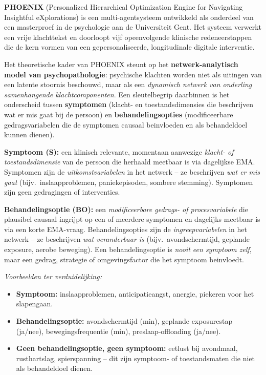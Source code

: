 \documentclass[11pt,a4paper]{article}
\begin{document}
\textbf{PHOENIX} (Personalized Hierarchical Optimization Engine for Navigating
Insightful eXplorations) is een multi-agentsysteem ontwikkeld als onderdeel van
een masterproef in de psychologie aan de Universiteit Gent. Het systeem verwerkt
een vrije klachttekst en doorloopt vijf opeenvolgende klinische redeneerstappen
die de kern vormen van een gepersonaliseerde, longitudinale digitale interventie.

Het theoretische kader van PHOENIX steunt op het \textbf{netwerk-analytisch model
van psychopathologie}: psychische klachten worden niet
als uitingen van een latente stoornis beschouwd, maar als een \emph{dynamisch
netwerk van onderling samenhangende klachtcomponenten}. Een sleutelbegrip daarbinnen
is het onderscheid tussen \textbf{symptomen} (klacht- en toestandsdimensies die
beschrijven wat er mis gaat bij de persoon) en \textbf{behandelingsopties}
(modificeerbare gedragsvariabelen die de symptomen causaal beinvloeden en als
behandeldoel kunnen dienen).

\vspace{0.4em}
\begin{instrbox}[title={Kerndefinities: symptoom versus behandelingsoptie}]
\small
\textbf{Symptoom (S):} een klinisch relevante, momentaan aanwezige
\emph{klacht- of toestandsdimensie} van de persoon die herhaald meetbaar is via
dagelijkse EMA. Symptomen zijn de \emph{uitkomstvariabelen} in het netwerk -- ze
beschrijven \emph{wat er mis gaat} (bijv.\ inslaapproblemen, paniekepisoden,
sombere stemming). Symptomen zijn geen gedragingen of interventies.

\medskip
\textbf{Behandelingsoptie (BO):} een \emph{modificeerbare gedrags- of procesvariabele}
die plausibel causaal ingrijpt op een of meerdere symptomen en dagelijks meetbaar
is via een korte EMA-vraag. Behandelingsopties zijn de \emph{ingreepvariabelen} in het
netwerk -- ze beschrijven \emph{wat veranderbaar is} (bijv.\ avondschermtijd,
geplande exposure, aerobe beweging). Een behandelingsoptie is \emph{nooit een symptoom zelf},
maar een gedrag, strategie of omgevingsfactor die het symptoom beinvloedt.

\medskip\small
\textit{Voorbeelden ter verduidelijking:}
\begin{itemize}[topsep=1pt,itemsep=0pt]
\item \textbf{Symptoom:} inslaapproblemen, anticipatieangst, anergie, piekeren voor het slapengaan.
\item \textbf{Behandelingsoptie:} avondschermtijd (min), geplande exposurestap (ja/nee),
bewegingsfrequentie (min), preslaap-offloading (ja/nee).
\item \textbf{Geen behandelingsoptie, geen symptoom:} eetlust bij avondmaal, rusthartslag,
spierspanning -- dit zijn symptoom- of toestandsmaten die niet als behandeldoel dienen.
\end{itemize}
\end{instrbox}
\end{document}
